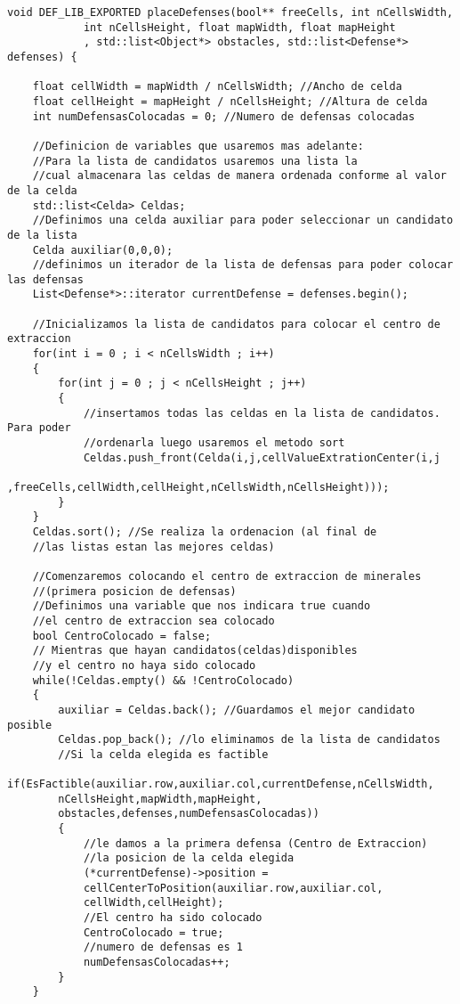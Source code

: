 \begin{lstlisting}[frame=single,basicstyle=\tiny,title={Voraz total}]
void DEF_LIB_EXPORTED placeDefenses(bool** freeCells, int nCellsWidth, 
			int nCellsHeight, float mapWidth, float mapHeight
            , std::list<Object*> obstacles, std::list<Defense*> defenses) {
	
    float cellWidth = mapWidth / nCellsWidth; //Ancho de celda
    float cellHeight = mapHeight / nCellsHeight; //Altura de celda
    int numDefensasColocadas = 0; //Numero de defensas colocadas

	//Definicion de variables que usaremos mas adelante:
	//Para la lista de candidatos usaremos una lista la 
	//cual almacenara las celdas de manera ordenada conforme al valor de la celda
	std::list<Celda> Celdas;
	//Definimos una celda auxiliar para poder seleccionar un candidato de la lista
	Celda auxiliar(0,0,0);
	//definimos un iterador de la lista de defensas para poder colocar las defensas
	List<Defense*>::iterator currentDefense = defenses.begin();
		
	//Inicializamos la lista de candidatos para colocar el centro de extraccion
	for(int i = 0 ; i < nCellsWidth ; i++)
	{
		for(int j = 0 ; j < nCellsHeight ; j++)
		{
			//insertamos todas las celdas en la lista de candidatos. Para poder 
			//ordenarla luego usaremos el metodo sort
			Celdas.push_front(Celda(i,j,cellValueExtrationCenter(i,j
			,freeCells,cellWidth,cellHeight,nCellsWidth,nCellsHeight)));
		}
	}
	Celdas.sort(); //Se realiza la ordenacion (al final de 
	//las listas estan las mejores celdas)

	//Comenzaremos colocando el centro de extraccion de minerales 
	//(primera posicion de defensas)
	//Definimos una variable que nos indicara true cuando 
	//el centro de extraccion sea colocado
	bool CentroColocado = false; 
	// Mientras que hayan candidatos(celdas)disponibles 
	//y el centro no haya sido colocado
	while(!Celdas.empty() && !CentroColocado) 
	{
		auxiliar = Celdas.back(); //Guardamos el mejor candidato posible
		Celdas.pop_back(); //lo eliminamos de la lista de candidatos
		//Si la celda elegida es factible
		if(EsFactible(auxiliar.row,auxiliar.col,currentDefense,nCellsWidth,
		nCellsHeight,mapWidth,mapHeight,
		obstacles,defenses,numDefensasColocadas))  
		{
			//le damos a la primera defensa (Centro de Extraccion) 
			//la posicion de la celda elegida
			(*currentDefense)->position = 
			cellCenterToPosition(auxiliar.row,auxiliar.col,
			cellWidth,cellHeight); 
			//El centro ha sido colocado
			CentroColocado = true; 
			//numero de defensas es 1
			numDefensasColocadas++; 
		}
	}
	

\end{lstlisting}
